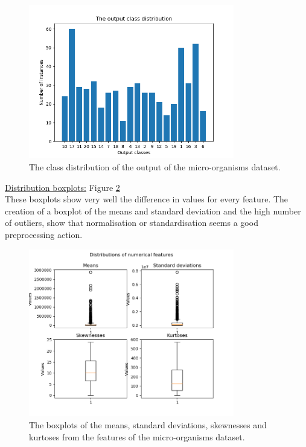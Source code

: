 \documentclass[10pt,a4paper]{article}
\begin{document}
\begin{itemize}
		\begin{figure}[]
			\centering
			\includegraphics[width=0.8\textwidth]{MO_Class.png}
			\caption{The class distribution of the output of the micro-organisms dataset.}
			\label{fig:MOClass}
		\end{figure}
		
		\underline{Distribution boxplots:} Figure \ref{fig:MODist} \\
		
		These boxplots show very well the difference in values for every feature. The creation of a boxplot of the means and standard deviation and the high number of outliers, show that normalisation or standardisation seems a good preprocessing action.
		
		\begin{figure}[]
			\centering
			\includegraphics[width=0.8\textwidth]{MO_Dist.png}
			\caption{The boxplots of the means, standard deviations, skewnesses and kurtoses from the features of the micro-organisms dataset.}
			\label{fig:MODist}
		\end{figure}
		

\end{itemize}
\end{document}

